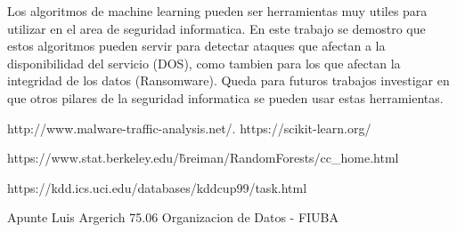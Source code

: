 \documentclass[a4paper,10pt]{article}
\begin{document}
Los algoritmos de machine learning pueden ser herramientas muy utiles para utilizar en el area de seguridad informatica. En este trabajo se demostro que estos algoritmos pueden servir para detectar ataques que afectan a la disponibilidad del servicio (DOS), como tambien para los que afectan la integridad de los datos (Ransomware). Queda para futuros trabajos investigar en que otros pilares de la seguridad informatica se pueden usar estas herramientas.
\newpage





\begin{thebibliography}{9}
  http://www.malware-traffic-analysis.net/.
 https://scikit-learn.org/

 https://www.stat.berkeley.edu/\~breiman/RandomForests/cc\_home.html

 https://kdd.ics.uci.edu/databases/kddcup99/task.html


 Apunte Luis Argerich 75.06 Organizacion de Datos - FIUBA
\end{thebibliography}
\end{document}
